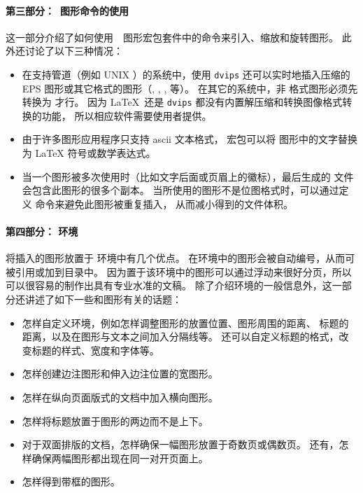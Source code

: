 \paragraph{第三部分：\LaTeXe{}~图形命令的使用}
这一部分介绍了如何使用~\LaTeXe{}~图形宏包套件中的命令来引入、缩放和旋转图形。
此外还讨论了以下三种情况：
\begin{itemize}
	\item 在支持管道（例如 UNIX ）的系统中，使用 \texttt{dvips} 还可以实时地插入压缩的 EPS 图形或其它格式的图形（, , ,  等）。
	在其它的系统中，非  格式图形必须先转换为  才行。
	因为 \LaTeX\ 还是 \texttt{dvips} 都没有内置解压缩和转换图像格式转换的功能，
	所以相应软件需要使用者提供。
	\item 由于许多图形应用程序只支持 ascii 文本格式，
	 宏包可以将  图形中的文字替换为 \LaTeX{} 符号或数学表达式。
	\item 当一个图形被多次使用时（比如文字后面或页眉上的徽标），最后生成的  文件会包含此图形的很多个副本。
	当所使用的图形不是位图格式时，可以通过定义  命令来避免此图形被重复插入，
	从而减小得到的文件体积。
\end{itemize}

\paragraph{第四部分： 环境}
将插入的图形放置于 环境中有几个优点。
在环境中的图形会被自动编号，从而可被引用或加到目录中。
因为置于该环境中的图形可以通过浮动来很好分页，所以可以很容易的制作出具有专业水准的文稿。
除了介绍环境的一般信息外，这一部分还讲述了如下一些和图形有关的话题：
\begin{itemize}
	\item 怎样自定义环境，例如怎样调整图形的放置位置、图形周围的距离、
	标题的距离，以及在图形与文本之间加入分隔线等。
	还可以自定义标题的格式，改变标题的样式、宽度和字体等。
	\item 怎样创建边注图形和伸入边注位置的宽图形。
	\item 怎样在纵向页面版式的文档中加入横向图形。
	\item 怎样将标题放置于图形的两边而不是上下。
	\item 对于双面排版的文档，怎样确保一幅图形放置于奇数页或偶数页。
	还有，怎样确保两幅图形都出现在同一对开页面上。
	\item 怎样得到带框的图形。
\end{itemize}

